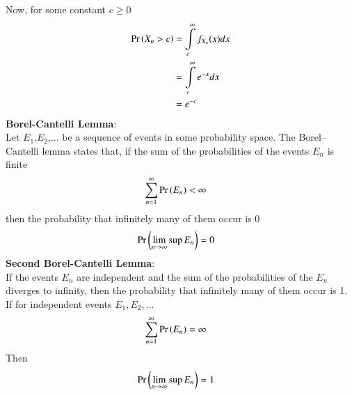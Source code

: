 \documentclass[journal,12pt,twocolumn]{IEEEtran}
\begin{document}
Now, for some constant $c\geq0$
\begin{align}
    \Pr\left(X_n>c\right)&=\int\limits_{c}^{\infty}f_{X_n}(x)dx\nonumber\\
              &=\int\limits_{c}^{\infty}e^{-x}dx\nonumber\\
              &=e^{-c}\label{b}
\end{align}
\textbf{Borel-Cantelli Lemma}:\\
Let $E_1$,$E_2$,... be a sequence of events in some probability space. The Borel–Cantelli lemma states that, if the sum of the probabilities of the events $E_n$ is finite
\begin{align}
    \sum_{n=1}^{\infty}\Pr\left(E_n\right)&<\infty
\end{align}
then the probability that infinitely many of them occur is 0
\begin{align}
    \Pr\left(\lim_{n \rightarrow \infty}\sup E_n\right)&=0
\end{align}
\textbf{Second Borel-Cantelli Lemma}:\\
If the events $E_n$ are independent and the sum of the probabilities of the $E_n$ diverges to infinity, then the probability that infinitely many of them occur is 1.
If for independent events $E_1,E_2,...$
\begin{align}
    \sum_{n=1}^{\infty}\Pr\left(E_n\right)&=\infty
\end{align}
Then
\begin{align}
    \Pr\left(\lim_{n \rightarrow \infty}\sup E_n\right)&=1
\end{align}
\bigskip
\end{document}
